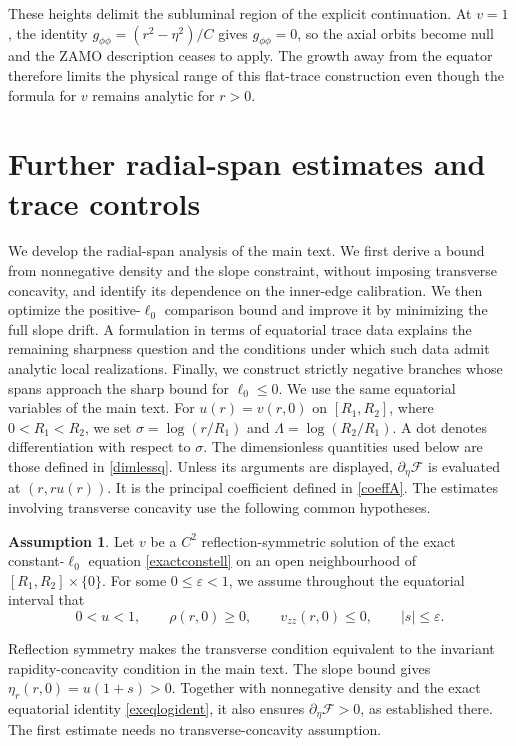 \documentclass[amsmath,amsfonts,amssymb,aps,pra,superscriptaddress,10pt]{revtex4-2}
\numberwithin{equation}{section}
\theoremstyle{plain}
\theoremstyle{definition}
\theoremstyle{remark}
\theoremstyle{definition}
\newtheorem{assumption}[definition]{Assumption}
\newcommand{\ellzero}{\ell_0}
\begin{document}
These heights delimit the subluminal region of the explicit continuation. At $v=1$, the identity $g_{\phi\phi}=(r^2-\eta^2)/C$ gives $g_{\phi\phi}=0$, so the axial orbits become null and the ZAMO description ceases to apply. The growth away from the equator therefore limits the physical range of this flat-trace construction even though the formula for $v$ remains analytic for $r>0$.

\section{Further radial-span estimates and trace controls} \label{suppspananal}

We develop the radial-span analysis of the main text. We first derive a bound from nonnegative density and the slope constraint, without imposing transverse concavity, and identify its dependence on the inner-edge calibration. We then optimize the positive-$\ellzero$ comparison bound and improve it by minimizing the full slope drift. A formulation in terms of equatorial trace data explains the remaining sharpness question and the conditions under which such data admit analytic local realizations. Finally, we construct strictly negative branches whose spans approach the sharp bound for $\ellzero\leq 0$. We use the same equatorial variables of the main text. For $u(r)=v(r,0)$ on $[R_1,R_2]$, where $0<R_1<R_2$, we set $\sigma=\log{(r/R_1)}$ and $\Lambda=\log{(R_2/R_1)}$. A dot denotes differentiation with respect to $\sigma$. The dimensionless quantities used below are those defined in \eqref{dimlessq}. Unless its arguments are displayed, $\partial_\eta\mathcal{F}$ is evaluated at $(r,ru(r))$. It is the principal coefficient defined in \eqref{coeffA}. The estimates involving transverse concavity use the following common hypotheses.

\begin{assumption}\label{spanhyp}
Let $v$ be a $C^2$ reflection-symmetric solution of the exact constant-$\ellzero$ equation \eqref{exactconstell} on an open neighbourhood of $[R_1,R_2]\times\{0\}$. For some $0\leq\varepsilon<1$, we assume throughout the equatorial interval that
\begin{equation}
0<u<1,\qquad 
\rho(r,0)\geq 0,\qquad
v_{zz}(r,0)\leq 0,\qquad 
|s|\leq\varepsilon.
\end{equation}
\end{assumption}

Reflection symmetry makes the transverse condition equivalent to the invariant rapidity-concavity condition in the main text. The slope bound gives $\eta_r(r,0)=u(1+s)>0$. Together with nonnegative density and the exact equatorial identity \eqref{exeqlogident}, it also ensures $\partial_\eta\mathcal{F}>0$, as established there. The first estimate needs no transverse-concavity assumption.
\end{document}
